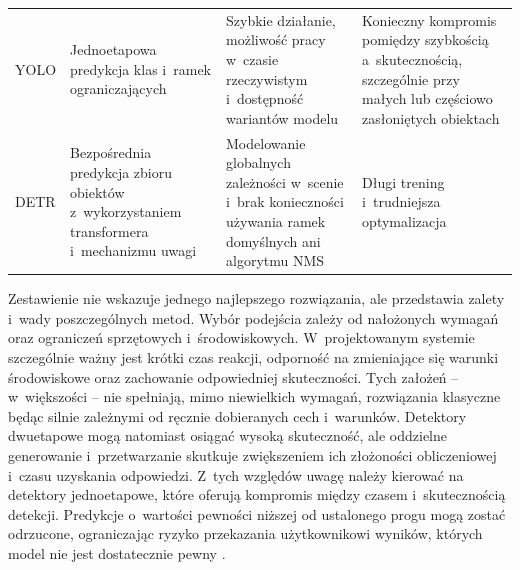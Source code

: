 \begin{table}[ht!]
\begin{tabularx}{\textwidth}{
        >{\raggedright\arraybackslash}p{1.8cm}
        >{\raggedright\arraybackslash}p{3.3cm}
        >{\raggedright\arraybackslash}X
        >{\raggedright\arraybackslash}X
        }
        \addlinespace

        YOLO                                                                                                       &
        Jednoetapowa predykcja klas i~ramek ograniczających                                                        &
        Szybkie działanie, możliwość pracy w~czasie rzeczywistym i~dostępność wariantów modelu                     &
        Konieczny kompromis pomiędzy szybkością a~skutecznością, szczególnie przy małych lub częściowo zasłoniętych obiektach   \\

        \addlinespace

        DETR                                                                                                       &
        Bezpośrednia predykcja zbioru obiektów z~wykorzystaniem transformera i~mechanizmu uwagi                    &
        Modelowanie globalnych zależności w~scenie i~brak konieczności używania ramek domyślnych ani algorytmu NMS &
        Długi trening i~trudniejsza optymalizacja                                                                               \\

        \bottomrule
    \end{tabularx}
\end{table}

Zestawienie nie wskazuje jednego najlepszego rozwiązania, ale przedstawia zalety i~wady poszczególnych metod. Wybór podejścia zależy od nałożonych wymagań oraz ograniczeń sprzętowych i~środowiskowych. W~projektowanym systemie szczególnie ważny jest krótki czas reakcji, odporność na zmieniające się warunki środowiskowe oraz zachowanie odpowiedniej skuteczności. Tych założeń -- w~większości -- nie spełniają, mimo niewielkich wymagań, rozwiązania klasyczne będąc silnie zależnymi od ręcznie dobieranych cech i~warunków. Detektory dwuetapowe mogą natomiast osiągać wysoką skuteczność, ale oddzielne generowanie i~przetwarzanie skutkuje zwiększeniem ich złożoności obliczeniowej i~czasu uzyskania odpowiedzi. Z~tych względów uwagę należy kierować na detektory jednoetapowe, które oferują kompromis między czasem i~skutecznością detekcji. Predykcje o~wartości pewności niższej od ustalonego progu mogą zostać odrzucone, ograniczając ryzyko przekazania użytkownikowi wyników, których model nie jest dostatecznie pewny \cite{bib:pratap2025adaptiveobjectdetectionindoor}.


